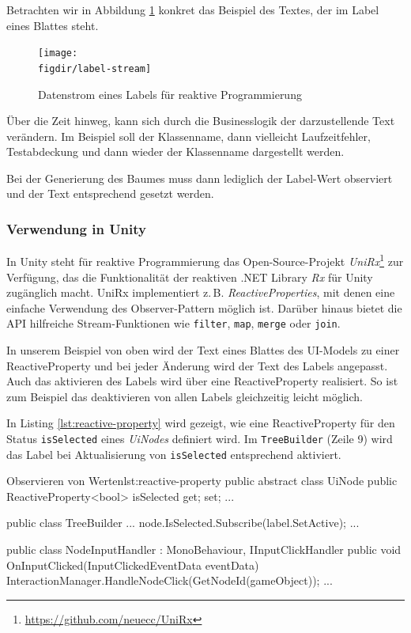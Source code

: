 Betrachten wir in Abbildung \ref{fig:label-stream} konkret das Beispiel des Textes, der im Label eines Blattes steht.

\begin{figure}[htb]
  \texttt{[image: \\figdir/label-stream]}
  \caption{Datenstrom eines Labels für reaktive Programmierung}
  \label{fig:label-stream}
\end{figure}

Über die Zeit hinweg, kann sich durch die Businesslogik der darzustellende Text verändern. Im Beispiel soll der Klassenname, dann vielleicht Laufzeitfehler, Testabdeckung und dann wieder der Klassenname dargestellt werden.

Bei der Generierung des Baumes muss dann lediglich der Label-Wert observiert und der Text entsprechend gesetzt werden.

\subsubsection*{Verwendung in Unity}

In Unity steht für reaktive Programmierung das Open-Source-Projekt \textit{UniRx}\footnote{\url{https://github.com/neuecc/UniRx}} zur Verfügung, das die Funktionalität der reaktiven .NET Library \textit{Rx} für Unity zugänglich macht. UniRx implementiert z.\,B. \textit{ReactiveProperties}, mit denen eine einfache Verwendung des Observer-Pattern möglich ist. Darüber hinaus bietet die API hilfreiche Stream-Funktionen wie \texttt{filter}, \texttt{map}, \texttt{merge} oder \texttt{join}.

In unserem Beispiel von oben wird der Text eines Blattes des UI-Models zu einer ReactiveProperty und bei jeder Änderung wird der Text des Labels angepasst. Auch das aktivieren des Labels wird über eine ReactiveProperty realisiert. So ist zum Beispiel das deaktivieren von allen Labels gleichzeitig leicht möglich.

In Listing \ref{lst:reactive-property} wird gezeigt, wie eine ReactiveProperty für den Status \texttt{isSelected} eines \textit{UiNodes} definiert wird. Im \texttt{TreeBuilder} (Zeile 9) wird das Label bei Aktualisierung von \texttt{isSelected} entsprechend aktiviert.

\begin{codesnippet}{Observieren von Werten}{lst:reactive-property}
public abstract class UiNode
{
    public ReactiveProperty<bool> isSelected { get; set; }
    ...
}

public class TreeBuilder {
    ...
    node.IsSelected.Subscribe(label.SetActive);
    ...
}

public class NodeInputHandler : MonoBehaviour, IInputClickHandler
{
    public void OnInputClicked(InputClickedEventData eventData)
    {
        InteractionManager.HandleNodeClick(GetNodeId(gameObject));
    }
    ...
}
\end{codesnippet}

